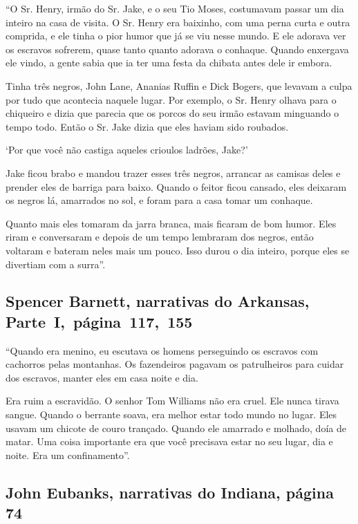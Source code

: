 ``O Sr. Henry, irmão do Sr. Jake, e o seu Tio Moses, costumavam passar
um dia inteiro na casa de visita. O Sr. Henry era baixinho, com uma
perna curta e outra comprida, e ele tinha o pior humor que já se viu
nesse mundo. E ele adorava ver os escravos sofrerem, quase tanto quanto
adorava o conhaque. Quando enxergava ele vindo, a gente sabia que ia ter
uma festa da chibata antes dele ir embora.

Tinha três negros, John Lane, Ananias Ruffin e Dick Bogers, que levavam
a culpa por tudo que acontecia naquele lugar. Por exemplo, o Sr. Henry
olhava para o chiqueiro e dizia que parecia que os porcos do seu irmão
estavam minguando o tempo todo. Então o Sr. Jake dizia que eles haviam
sido roubados.

`Por que você não castiga aqueles crioulos ladrões, Jake?'

Jake ficou brabo e mandou trazer esses três negros, arrancar as camisas
deles e prender eles de barriga para baixo. Quando o feitor ficou
cansado, eles deixaram os negros lá, amarrados no sol, e foram para a
casa tomar um conhaque.

Quanto mais eles tomaram da jarra branca, mais ficaram de bom humor.
Eles riram e conversaram e depois de um tempo lembraram dos negros,
então voltaram e bateram neles mais um pouco. Isso durou o dia inteiro,
porque eles se divertiam com a surra''.

\subsection{Spencer Barnett, narrativas do Arkansas, Parte~I,~página~117,~155} \label{ref18}

``Quando era menino, eu escutava os homens perseguindo os escravos com
cachorros pelas montanhas. Os fazendeiros pagavam os patrulheiros para
cuidar dos escravos, manter eles em casa noite e dia.

Era ruim a escravidão. O senhor Tom Williams não era cruel. Ele
nunca tirava sangue. Quando o berrante soava, era melhor estar todo
mundo no lugar. Eles usavam um chicote de couro trançado. Quando ele %
amarrado e molhado, doía de matar. Uma coisa importante era que você
precisava estar no seu lugar, dia e noite. Era um confinamento''.

\subsection{John Eubanks, narrativas do Indiana, página 74} \label{ref84}


